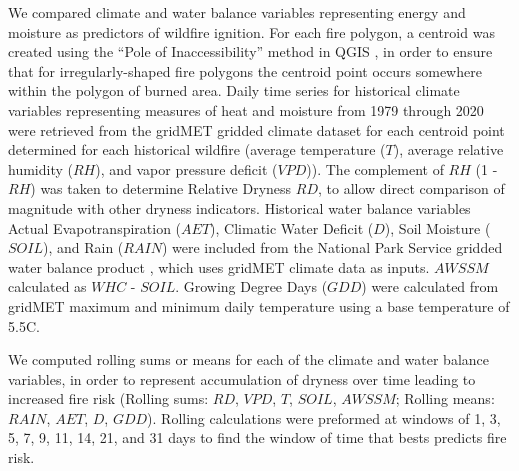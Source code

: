 \documentclass[11pt]{article}
\begin{document}
We compared climate and water balance variables representing energy and moisture as predictors of wildfire ignition. For each fire polygon, a centroid was created using the ``Pole of Inaccessibility'' method in QGIS \citep{QGIS_software}, in order to ensure that for irregularly-shaped fire polygons the centroid point occurs somewhere within the polygon of burned area. Daily time series for historical climate variables representing measures of heat and moisture from 1979 through 2020 were retrieved from the gridMET gridded climate dataset \citep{abatzoglouDevelopmentGriddedSurface2013} for each centroid point determined for each historical wildfire (average temperature ($T$), average relative humidity ($RH$), and vapor pressure deficit ($VPD$)).  The complement of $RH$ (1 - $RH$) was taken to determine Relative Dryness $RD$, to allow direct comparison of magnitude with other dryness indicators. Historical water balance variables Actual Evapotranspiration ($AET$), Climatic Water Deficit ($D$), Soil Moisture ($SOIL$), and Rain ($RAIN$) were included from the National Park Service gridded water balance product \citep{tercekHistoricalChangesPlant2021}, which uses gridMET climate data as inputs.  $AWSSM$ calculated as $WHC$ - $SOIL$.  Growing Degree Days ($GDD$) were calculated from gridMET maximum and minimum daily temperature using a base temperature of 5.5\degree C.

We computed rolling sums or means for each of the climate and water balance variables, in order to represent accumulation of dryness over time leading to increased fire risk (Rolling sums: $RD$, $VPD$, $T$, $SOIL$, $AWSSM$; Rolling means: $RAIN$, $AET$, $D$, $GDD$).  Rolling calculations were preformed at windows of 1, 3, 5, 7, 9, 11, 14, 21, and 31 days to find the window of time that bests predicts fire risk.
\end{document}
